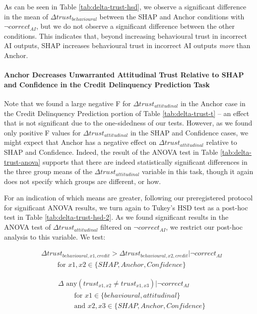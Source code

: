 As can be seen in Table \ref{tab:delta-trust-hsd}, we observe a significant difference in the mean of $\Delta trust_{behavioural}$ between the SHAP and Anchor conditions with $\neg correct_{AI}$, but we do not observe a significant difference between the other conditions. This indicates that, beyond increasing behavioural trust in incorrect AI outputs, SHAP increases behavioural trust in incorrect AI outputs \emph{more} than Anchor.

\paragraph{Anchor Decreases Unwarranted Attitudinal Trust Relative to SHAP and Confidence in the Credit Delinquency Prediction Task}
Note that we found a large negative F for $\Delta trust_{attitudinal}$ in the Anchor case in the Credit Delinquency Prediction portion of Table \ref{tab:delta-trust-t} – an effect that is not significant due to the one-sidedness of our tests. However, as we found only positive F values for $\Delta trust_{attitudinal}$ in the SHAP and Confidence cases, we might expect that Anchor has a negative effect on $\Delta trust_{attitudinal}$ relative to SHAP and Confidence. Indeed, the result of the ANOVA test in Table \ref{tab:delta-trust-anova} supports that there are indeed statistically significant differences in the three group means of the $\Delta trust_{attitudinal}$ variable in this task, though it again does not specify which groups are different, or how.

For an indication of which means are greater, following our preregistered protocol for significant ANOVA results, we turn again to Tukey's HSD test as a post-hoc test in Table \ref{tab:delta-trust-hsd-2}. As we found significant results in the ANOVA test of $\Delta trust_{attitudinal}$ filtered on $\neg correct_{AI}$, we restrict our post-hoc analysis to this variable. We test:

\begin{equation}
    \begin{split}
        & \Delta trust_{behavioural,x1,credit} > \Delta trust_{behavioural,x2,credit} | \neg correct_{AI} \\
        & \qquad \text{ for } x1,x2 \in \{SHAP, Anchor, Confidence\}
    \end{split}
\end{equation}

\begin{equation}
    \begin{split}
        & \Delta \text{ any}(trust_{x1,x2} \neq trust_{x1,x3}) | \neg correct_{AI} \\
        & \qquad \text{ for } x1 \in \{behavioural, attitudinal\} \\
        & \qquad \text{ and } x2,x3 \in \{SHAP, Anchor, Confidence\}
    \end{split}
\end{equation}

